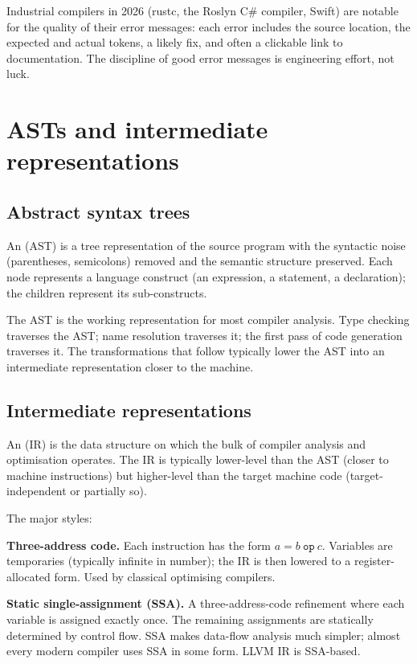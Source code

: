 Industrial compilers in 2026 (rustc, the Roslyn C\# compiler, Swift) are notable for the quality of their error messages: each error includes the source location, the expected and actual tokens, a likely fix, and often a clickable link to documentation. The discipline of good error messages is engineering effort, not luck.

\section{ASTs and intermediate representations}

\subsection{Abstract syntax trees}

An  (AST) is a tree representation of the source program with the syntactic noise (parentheses, semicolons) removed and the semantic structure preserved. Each node represents a language construct (an expression, a statement, a declaration); the children represent its sub-constructs.

The AST is the working representation for most compiler analysis. Type checking traverses the AST; name resolution traverses it; the first pass of code generation traverses it. The transformations that follow typically lower the AST into an intermediate representation closer to the machine.

\subsection{Intermediate representations}

An  (IR) is the data structure on which the bulk of compiler analysis and optimisation operates. The IR is typically lower-level than the AST (closer to machine instructions) but higher-level than the target machine code (target-independent or partially so).

The major styles:

\textbf{Three-address code.} Each instruction has the form $a = b\ \texttt{op}\ c$. Variables are temporaries (typically infinite in number); the IR is then lowered to a register-allocated form. Used by classical optimising compilers.

\textbf{Static single-assignment (SSA).} A three-address-code refinement where each variable is assigned exactly once. The remaining assignments are statically determined by control flow. SSA makes data-flow analysis much simpler; almost every modern compiler uses SSA in some form. LLVM IR is SSA-based.


